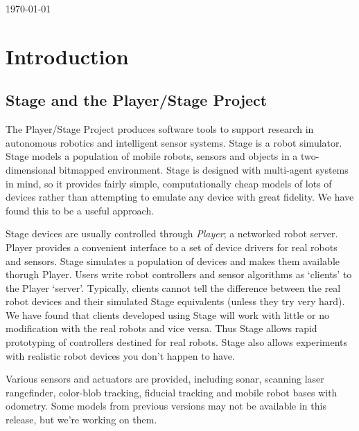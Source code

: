\documentclass[letter,11pt,twoside]{report}
\begin{document}
  \vspace{4cm}

 \centerline{\today}

\tableofcontents


\setcounter{page}{0}


\chapter{Introduction}

\section{ Stage and the Player/Stage Project}

The Player/Stage Project produces software tools to support research
in autonomous robotics and intelligent sensor systems. Stage is a
robot simulator. Stage models a population of mobile robots, sensors
and objects in a two-dimensional bitmapped environment. Stage is
designed with multi-agent systems in mind, so it provides fairly
simple, computationally cheap models of lots of devices rather than
attempting to emulate any device with great fidelity. We have found
this to be a useful approach.

Stage devices are usually controlled through \emph{Player}; a
networked robot server. Player provides a convenient interface to a
set of device drivers for real robots and sensors. Stage simulates a
population of devices and makes them available thorugh Player. Users
write robot controllers and sensor algorithms as `clients' to the
Player `server'. Typically, clients cannot tell the difference between
the real robot devices and their simulated Stage equivalents (unless
they try very hard). We have found that clients developed using Stage
will work with little or no modification with the real robots and vice
versa. Thus Stage allows rapid prototyping of controllers destined for
real robots. Stage also allows experiments with realistic robot
devices you don't happen to have.
  
Various sensors and actuators are provided, including sonar, scanning
laser rangefinder, color-blob tracking, fiducial tracking and mobile
robot bases with odometry. Some models from previous versions may not
be available in this release, but we're working on them.
\end{document}
